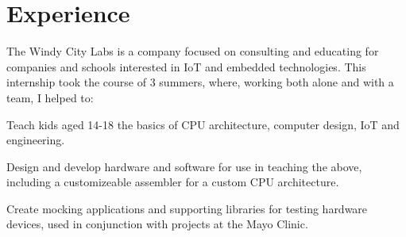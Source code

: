 \documentclass[]{deedy-resume-reversed}
\begin{document}
%
%

%
%

%
%

\begin{minipage}[t]{0.60\textwidth}


	\section{Experience}
	\vspace{\topsep} %

	The Windy City Labs is a company focused on consulting and educating for companies and schools interested in IoT and embedded technologies. This internship took the course of 3 summers, where, working both alone and with a team, I helped to:

	\vspace{\topsep} %

	\begin{tightemize}
		\item Teach kids aged 14-18 the basics of CPU architecture, computer design, IoT and engineering.
		\item Design and develop hardware and software for use in teaching the above, including a customizeable
		assembler for a custom CPU architecture.
		\item Create mocking applications and supporting libraries for testing hardware devices, used in conjunction with projects at the Mayo Clinic.
	\end{tightemize}
	\sectionsep




\end{minipage}
\end{document}
